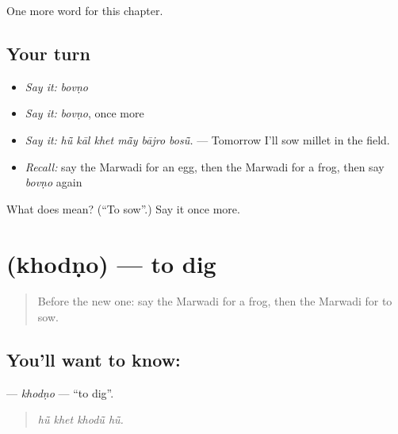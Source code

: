 \begin{grammarlens}[title={What you've built}]
One more word for this chapter.
\end{grammarlens}

\subsection*{Your turn}
\begin{itemize}
\raggedright
  \item \emph{Say it:} \emph{bovṇo}
  \item \emph{Say it:} \emph{bovṇo}, once more
  \item \emph{Say it:} \emph{hū̃ kāl khet mā̃y bājro bosū̃.} — Tomorrow I'll sow millet in the field.
  \item \emph{Recall:} say the Marwadi for an egg, then the Marwadi for a frog, then say \emph{bovṇo} again
\end{itemize}

\begin{tcolorbox}[breakable,colback=teal!4,colframe=teal!35!black,title={Before you move on}]
What does  mean? (\textquotedblleft{}To sow\textquotedblright{}.) Say it once more.
\end{tcolorbox}
\section[\texorpdfstring{\mw{खोदणो} (khodṇo)}{खोदणो (khodṇo)}]{ (khodṇo) — to dig}

\label{lesson:MW-C238-khodno}



\begin{quote}
Before the new one: say the Marwadi for a frog, then the Marwadi for to sow.
\end{quote}

\subsection*{You'll want to know: }
\textbf{} — \emph{khodṇo} — \textquotedblleft{}to dig\textquotedblright{}.

\begin{quote}
   
\end{quote}

\begin{quote}
\emph{hū̃ khet khodū̃ hū̃.}
\end{quote}

